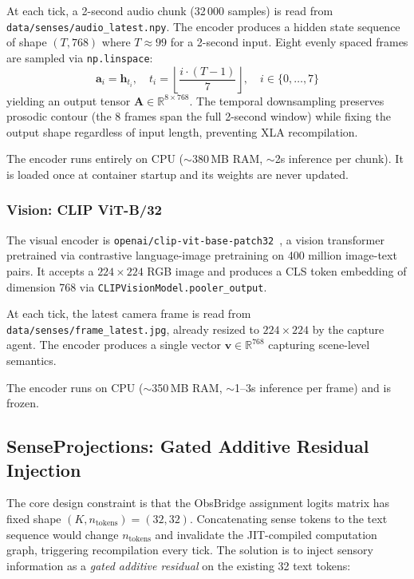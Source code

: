 At each tick, a 2-second audio chunk (32\,000 samples) is read from \texttt{data/senses/audio\_latest.npy}.
The encoder produces a hidden state sequence of shape $(T, 768)$ where $T \approx 99$ for a 2-second input.
Eight evenly spaced frames are sampled via \texttt{np.linspace}:
\begin{equation}
\mathbf{a}_i = \mathbf{h}_{t_i}, \quad t_i = \left\lfloor \frac{i \cdot (T-1)}{7} \right\rfloor, \quad i \in \{0, \ldots, 7\}
\end{equation}
yielding an output tensor $\mathbf{A} \in \mathbb{R}^{8 \times 768}$.
The temporal downsampling preserves prosodic contour (the 8 frames span the full 2-second window) while fixing the output shape regardless of input length, preventing XLA recompilation.

The encoder runs entirely on CPU ($\sim$380\,MB RAM, $\sim$2s inference per chunk).
It is loaded once at container startup and its weights are never updated.

\subsubsection{Vision: CLIP ViT-B/32}

The visual encoder is \texttt{openai/clip-vit-base-patch32}~\cite{clip2021}, a vision transformer pretrained via contrastive language-image pretraining on 400 million image-text pairs.
It accepts a $224 \times 224$ RGB image and produces a CLS token embedding of dimension 768 via \texttt{CLIPVisionModel.pooler\_output}.

At each tick, the latest camera frame is read from \texttt{data/senses/frame\_latest.jpg}, already resized to $224 \times 224$ by the capture agent.
The encoder produces a single vector $\mathbf{v} \in \mathbb{R}^{768}$ capturing scene-level semantics.

The encoder runs on CPU ($\sim$350\,MB RAM, $\sim$1--3s inference per frame) and is frozen.

\subsection{SenseProjections: Gated Additive Residual Injection}
\label{sec:sense_proj}

The core design constraint is that the ObsBridge assignment logits matrix has fixed shape $(K, n_{\mathrm{tokens}}) = (32, 32)$.
Concatenating sense tokens to the text sequence would change $n_{\mathrm{tokens}}$ and invalidate the JIT-compiled computation graph, triggering recompilation every tick.
The solution is to inject sensory information as a \emph{gated additive residual} on the existing 32 text tokens:

